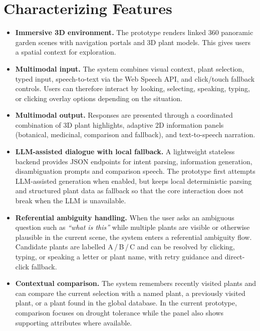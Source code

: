 \documentclass[12pt,a4paper]{article}
\begin{document}
\section{Characterizing Features}
\begin{itemize}
    \item \textbf{Immersive 3D environment.} The prototype renders linked
    360\textdegree{} panoramic garden scenes with navigation
    portals and 3D plant models. This gives users a spatial
    context for exploration.

    \item \textbf{Multimodal input.} The system combines visual context,
    plant selection, typed input, speech-to-text via the Web
    Speech API, and click/touch fallback controls. Users can therefore
    interact by looking, selecting, speaking, typing, or clicking overlay
    options depending on the situation.

    \item \textbf{Multimodal output.} Responses are presented through a
    coordinated combination of 3D plant highlights, adaptive 2D information
    panels (botanical, medicinal, comparison and fallback), and text-to-speech
    narration.

    \item \textbf{LLM-assisted dialogue with local fallback.} A lightweight
    stateless backend provides JSON endpoints for intent parsing, information
    generation, disambiguation prompts and comparison speech. The prototype
    first attempts LLM-assisted generation when enabled, but keeps local
    deterministic parsing and structured plant data as fallback so that the
    core interaction does not break when the LLM is unavailable.

    \item \textbf{Referential ambiguity handling.} When the user asks an
    ambiguous question such as \emph{``what is this''} while multiple plants
    are visible or otherwise plausible in the current scene, the system enters
    a referential ambiguity flow. Candidate plants are labelled
    A\,/\,B\,/\,C and can be resolved by clicking, typing, or speaking a
    letter or plant name, with retry guidance and direct-click fallback.

    \item \textbf{Contextual comparison.} The system remembers recently
    visited plants and can compare the current selection with a named plant,
    a previously visited plant, or a plant found in the global database. In
    the current prototype, comparison focuses on drought tolerance while the
    panel also shows supporting attributes where available.
\end{itemize}
\end{document}
